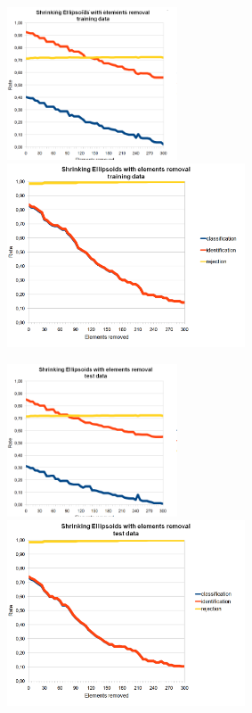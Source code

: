 \begin{figure}[htp]
	\centering
	\centerline{
		\includegraphics[width=0.45\textwidth]{Figures/charts/MUSIC_NOTES/DIGITS_ShrinkingEllipsoidsElementsRemovalTraining_cropped.png}
		\includegraphics[width=0.63\textwidth]{Figures/charts/MUSIC_NOTES_STANDARIZED/DIGITS_ShrinkingEllipsoidsElementsRemovalTraining.png}}
	\hspace{12pt}
	\centerline{
		\includegraphics[width=0.45\textwidth]{Figures/charts/MUSIC_NOTES/DIGITS_ShrinkingEllipsoidsElementsRemovalTest_cropped.png}
		\includegraphics[width=0.63\textwidth]{Figures/charts/MUSIC_NOTES_STANDARIZED/DIGITS_ShrinkingEllipsoidsElementsRemovalTest.png}}

\end{figure}
